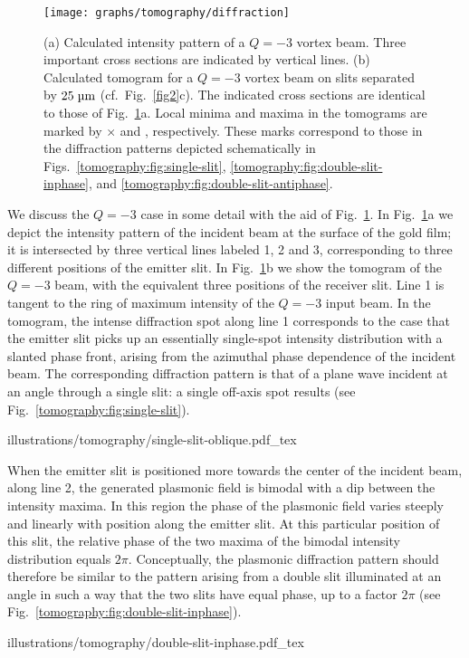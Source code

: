 \begin{figure}[tb]
\forceversofloat\centering
\texttt{[image: graphs/tomography/diffraction]}
\caption{(a) Calculated intensity pattern of a $Q = -3$ vortex beam.
Three important cross sections are indicated by vertical lines.
(b) Calculated tomogram for a $Q = -3$ vortex beam on slits separated by $25\micron$ (cf.\ Fig.~\ref{fig2}c). The indicated cross sections are identical to those of Fig.~\ref{fig4}a. Local minima and maxima in the tomograms are marked by $\times$ and \textopenbullet, respectively.
These marks correspond to those in the diffraction patterns depicted schematically in Figs.~\ref{tomography:fig:single-slit}, \ref{tomography:fig:double-slit-inphase}, and \ref{tomography:fig:double-slit-antiphase}.}
\label{fig4}
\end{figure}
%
We discuss the $Q = -3$ case in some detail with the aid of Fig.~\ref{fig4}. In Fig.~\ref{fig4}a we depict the intensity pattern of the incident beam at the surface of the gold film; it is intersected by three vertical lines labeled 1, 2 and 3, corresponding to three different positions of the emitter slit. In Fig.~\ref{fig4}b we show the tomogram of the $Q = -3$ beam, with the equivalent three positions of the receiver slit.
Line 1 is tangent to the ring of maximum intensity of the $Q=-3$ input beam.
In the tomogram, the intense diffraction spot along line 1 corresponds to the case that the emitter slit picks up an essentially single-spot intensity distribution with a slanted phase front, arising from the azimuthal phase dependence of the incident beam. The corresponding diffraction pattern is that of a plane wave incident at an angle through a single slit: a single off-axis spot results (see Fig.~\ref{tomography:fig:single-slit}).
%
\begin{marginfigure}
\centering
{illustrations/tomography/single-slit-oblique.pdf_tex}
\caption{Diffraction pattern of light at a single slit under oblique incidence.
Corresponds to line 1 in Fig.~\ref{fig4}.}
\label{tomography:fig:single-slit}
\end{marginfigure}%

When the emitter slit is positioned more towards the center of the incident beam, along line 2, the generated plasmonic field is bimodal with a dip between the intensity maxima. In this region the phase of the plasmonic field varies steeply and linearly with position along the emitter slit. At this particular position of this slit, the relative phase of the two maxima of the bimodal intensity distribution equals $2\pi$. Conceptually, the plasmonic diffraction pattern should therefore be similar to the pattern arising from a double slit illuminated at an angle in such a way that the two slits have equal phase, up to a factor $2\pi$ (see Fig.~\ref{tomography:fig:double-slit-inphase}).
%
\begin{marginfigure}
\forcerectofloat\centering
{illustrations/tomography/double-slit-inphase.pdf_tex}
\caption{Diffraction pattern of light at a double slit under oblique incidence, such that the local field at the slits is in phase.
Corresponds to line 2 in Fig.~\ref{fig4}.}
\label{tomography:fig:double-slit-inphase}
\end{marginfigure}

